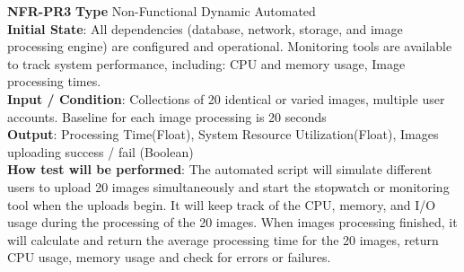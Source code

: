 \documentclass[12pt, titlepage]{article}
\begin{document}
\textbf{NFR-PR3} \textbf{Type} Non-Functional Dynamic Automated\\
        \indent \textbf{Initial State}: All dependencies (database, network, storage, and image processing engine) are configured and operational. Monitoring tools are available to track system performance, including: CPU and memory usage, Image processing times.\\
        \indent \textbf{Input / Condition}: Collections of 20 identical or varied images, multiple user accounts. Baseline for each image processing is 20 seconds\\
        \indent \textbf{Output}: Processing Time(Float), System Resource Utilization(Float), Images uploading success / fail (Boolean)\\
        \indent \textbf{How test will be performed}: The automated script will simulate different users to upload 20 images simultaneously and start the stopwatch or monitoring tool when the uploads begin. It will keep track of the CPU, memory, and I/O usage during the processing of the 20 images. When images processing finished, it will calculate and return the average processing time for the 20 images, return CPU usage, memory usage and check for errors or failures.\\
        \\
\end{document}
